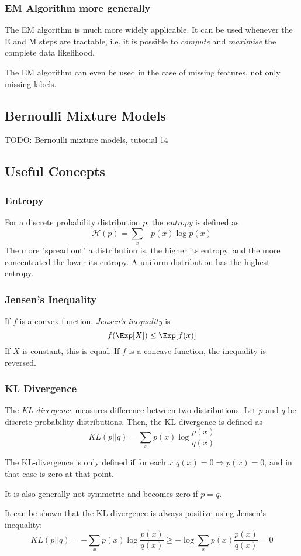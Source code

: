 \subsubsection{EM Algorithm more generally}
The EM algorithm is much more widely applicable.
It can be used whenever the E and M steps are
tractable,
i.e. it is possible to
\emph{compute} and \emph{maximise}
the complete data likelihood.

The EM algorithm can even be used in
the case of missing features,
not only missing labels.


\subsection{Bernoulli Mixture Models}
TODO: Bernoulli mixture models, tutorial 14


\subsection{Useful Concepts}
\subsubsection{Entropy}
For a discrete probability distribution $p$,
the \emph{entropy} is defined as
\begin{equation*}
    \mathcal{H}(p) = \sum_x{-p(x) \log{p(x)}}
\end{equation*}
The more "spread out" a distribution is,
the higher its entropy,
and the more concentrated the lower its entropy.
A uniform distribution has the highest entropy.

\subsubsection{Jensen’s Inequality}
If $f$ is a convex function, \emph{Jensen's inequality} is
\begin{equation*}
    f(\Exp[X]) \leq \Exp[f(x)]
\end{equation*}
If $X$ is constant, this is equal.
If $f$ is a concave function,
the inequality is reversed.

\subsubsection{KL Divergence}
The \emph{KL-divergence} measures difference between
two distributions.
Let $p$ and $q$ be discrete probability distributions.
Then, the KL-divergence is defined as
\begin{equation*}
    KL(p || q) = \sum_x{p(x) \log{\frac{p(x)}{q(x)}}}
\end{equation*}

The KL-divergence is only defined if
for each $x$ $q(x) = 0 \Rightarrow p(x) = 0$,
and in that case is zero at that point.

It is also generally not symmetric
and becomes zero if $p = q$.

It can be shown that the KL-divergence is
always positive using Jensen's inequality:
\begin{equation*}
    KL(p || q) = -\sum_x{p(x) \log{\frac{p(x)}{q(x)}}} \geq - \log{
        \sum_x{p(x) \frac{p(x)}{q(x)}}
    } = 0
\end{equation*}